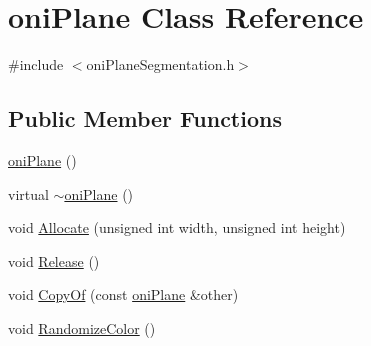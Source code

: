 \hypertarget{classoni_plane}{\section{oni\-Plane Class Reference}
\label{classoni_plane}
}


{\ttfamily \#include $<$oni\-Plane\-Segmentation.\-h$>$}

\subsection*{Public Member Functions}
\begin{DoxyCompactItemize}
\item 
\hyperlink{classoni_plane_a8eadfdf8a85d6e08510910f45e839fb8}{oni\-Plane} ()
\item 
virtual \hyperlink{classoni_plane_aa707b959e429b3ff92ad7d6734a228a4}{$\sim$oni\-Plane} ()
\item 
void \hyperlink{classoni_plane_a71932303419aaf7d173cbbe6b9ad12c2}{Allocate} (unsigned int width, unsigned int height)
\item 
void \hyperlink{classoni_plane_a91aaa2167649abcb6766d57001b9fd0d}{Release} ()
\item 
void \hyperlink{classoni_plane_a2ff8f1efff63e70c25ec9cad2c7ed99c}{Copy\-Of} (const \hyperlink{classoni_plane}{oni\-Plane} \&other)
\item 
void \hyperlink{classoni_plane_a12b31a9e64f9ffc9421bf587fafd83c8}{Randomize\-Color} ()
\end{DoxyCompactItemize}
